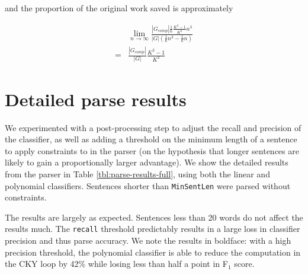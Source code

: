 \documentclass[11pt]{article}
\begin{document}
and the proportion of the original work saved is approximately

\begin{equation*}
\begin{split}
& \lim_{n \to \infty}\frac{|G_{comp}|\frac{1}{6}\frac{K^2-1}{K^2}n^3}{|G|(\frac{1}{6}n^3 - \frac{1}{6}n)}\\
=& \frac{|G_{comp}|}{|G|}\frac{K^2-1}{K^2}
\end{split}
\end{equation*}


\section{Detailed parse results}
\label{sec-8-2}

We experimented with a post-processing step to adjust the recall and precision of the classifier, as well as
adding a threshold on the minimum length of a sentence to apply constraints to in the parser (on the hypothesis
that longer sentences are likely to gain a proportionally larger advantage). We show the detailed results from
the parser in Table \ref{tbl:parse-results-full}, using both the linear and polynomial classifiers. Sentences
shorter than \texttt{MinSentLen} were parsed without constraints.

The results are largely as expected. Sentences less than 20 words do not affect the results much. The \texttt{recall} threshold
predictably results in a large loss in classifier precision and thus parse accuracy. We note the results in
boldface: with a high precision threshold, the polynomial classifier is able to reduce the computation in the CKY loop
by 42\% while losing less than half a point in F$_{\text{1}}$ score.
\end{document}
